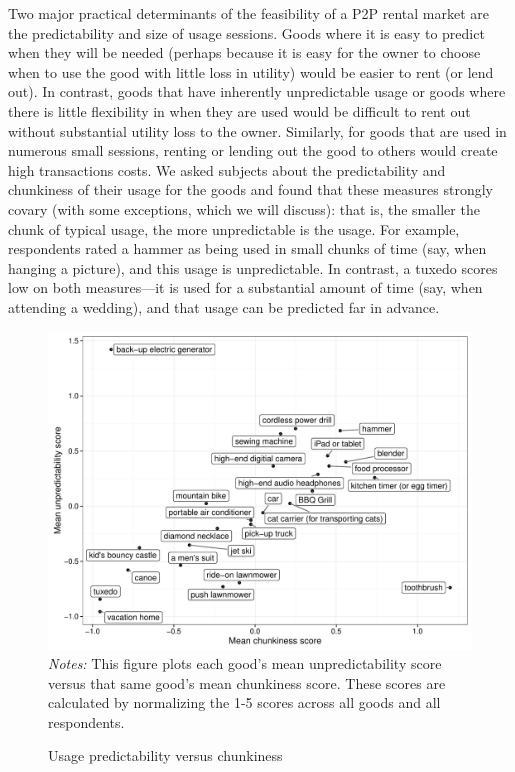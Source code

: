 \documentclass[11pt]{article}
\begin{document}
Two major practical determinants of the feasibility of a P2P rental market are the predictability and size of usage sessions.
Goods where it is easy to predict when they will be needed (perhaps because it is easy for the owner to choose when to use the good with little loss in utility) would be easier to rent (or lend out).
In contrast, goods that have inherently unpredictable usage or goods where there is little flexibility in when they are used would be difficult to rent out without substantial utility loss to the owner.
Similarly, for goods that are used in numerous small sessions, renting or lending out the good to others would create high transactions costs.
We asked subjects about the predictability and chunkiness of their usage for the goods and found that these measures strongly covary (with some exceptions, which we will discuss):
that is, the smaller the chunk of typical usage, the more unpredictable is the usage.
For example, respondents rated a hammer as being used in small chunks of time (say, when hanging a picture), and this usage is unpredictable. 
In contrast, a tuxedo scores low on both measures---it is used for a substantial amount of time (say, when attending a wedding), and that usage can be predicted far in advance.  

\begin{figure}
\centering 
\caption{Usage predictability versus chunkiness \label{fig:granularity_v_predictability}}
\begin{minipage}{0.90 \linewidth}
  \includegraphics[width = \linewidth]{./plots/granularity_versus_predictability.pdf} \\
  {\footnotesize 
    \emph{Notes:} This figure plots each good's mean unpredictability score versus that same good's mean chunkiness score.
    These scores are calculated by normalizing the 1-5 scores across all goods and all respondents. 
   }
\end{minipage} 
\end{figure} 
\end{document}
